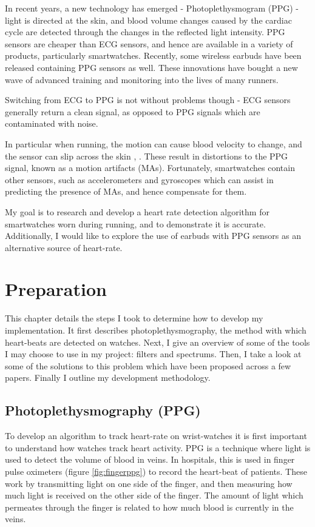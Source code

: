 \documentclass[12pt,a4paper,twoside,openany]{report}
\begin{document}
In recent years, a new technology has emerged - Photoplethysmogram (PPG) 
- light is directed at the skin, and blood volume changes caused by the
cardiac cycle are detected through the changes in the reflected light
intensity. PPG sensors are cheaper than ECG sensors, and hence are 
available in a variety of products, particularly smartwatches. Recently, some
wireless earbuds have been released containing PPG sensors as well. These 
innovations have bought a new wave of advanced training and monitoring into
the lives of many runners.

Switching from ECG to PPG is not without problems though - ECG sensors generally return a
clean signal, as opposed to PPG signals which are contaminated with
noise.

In particular when running, the motion can cause blood velocity to 
change, and the sensor can slip across the skin \cite{Wijshoff17}, 
\cite{Wood06}. These result in distortions to the PPG signal, known as a
motion artifacts (MAs). Fortunately, smartwatches contain other sensors, such
as accelerometers and gyroscopes which can assist in predicting the presence of 
MAs, and hence compensate for them.

My goal is to research and develop a heart rate detection algorithm
for smartwatches worn during running, and to demonstrate it is accurate.
Additionally, I would like to explore the use of earbuds with PPG sensors as
an alternative source of heart-rate. 



\chapter{Preparation}

This chapter details the steps I took to determine how to develop my
implementation. It first describes photoplethysmography, the method with which heart-beats are
detected on watches. Next,
I give an overview of some of the tools I may choose to use in my project:
filters and spectrums. Then, I take a look at some of the solutions to this
problem which have been proposed across a few papers. Finally I outline my
development methodology. 

\section{Photoplethysmography (PPG)}

To develop an algorithm to track heart-rate on wrist-watches it is first important to
understand how watches track heart activity. PPG is a technique where light is
used to detect the volume of blood in veins. In hospitals, this is used in
finger pulse oximeters (figure \ref{fig:fingerppg}) to record the heart-beat
of patients. These work by transmitting light on one side of the finger, and
then measuring how much light is received on the other side of the finger.
The amount of light which permeates through the finger is related to how much
blood is currently in the veins.
\end{document}
